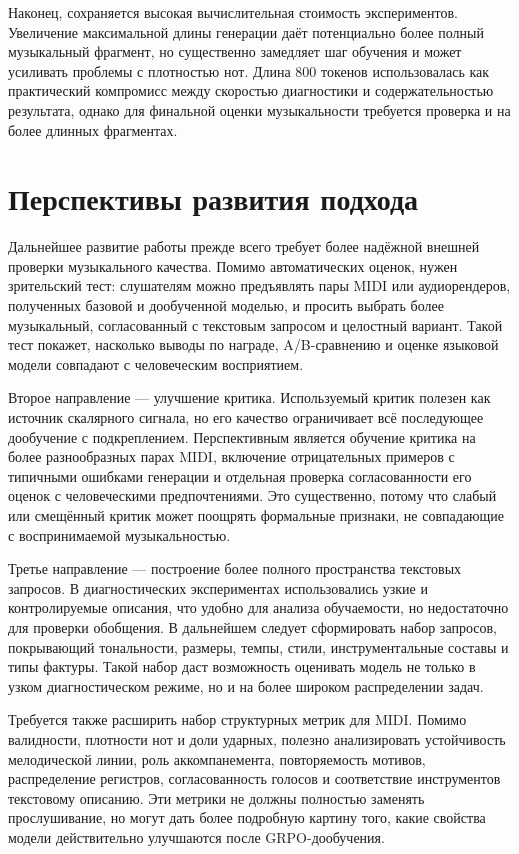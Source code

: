 \documentclass[a4paper,12pt]{extarticle}
\begin{document}
Наконец, сохраняется высокая вычислительная стоимость экспериментов.
Увеличение максимальной длины генерации даёт потенциально более полный
музыкальный фрагмент, но существенно замедляет шаг обучения и может усиливать
проблемы с плотностью нот. Длина 800 токенов использовалась как практический
компромисс между скоростью диагностики и содержательностью результата, однако
для финальной оценки музыкальности требуется проверка и на более длинных
фрагментах.

\section{Перспективы развития подхода}

Дальнейшее развитие работы прежде всего требует более надёжной внешней
проверки музыкального качества. Помимо автоматических оценок, нужен
зрительский тест: слушателям можно предъявлять пары MIDI или аудиорендеров,
полученных базовой и дообученной моделью, и просить выбрать более музыкальный,
согласованный с текстовым запросом и целостный вариант. Такой тест покажет,
насколько выводы по награде, A/B-сравнению и оценке языковой модели совпадают
с человеческим восприятием.

Второе направление --- улучшение критика. Используемый критик полезен
как источник скалярного сигнала, но его качество ограничивает всё последующее
дообучение с подкреплением. Перспективным является обучение критика на более
разнообразных
парах MIDI, включение отрицательных примеров с типичными ошибками генерации и
отдельная проверка согласованности его оценок с человеческими предпочтениями.
Это существенно, потому что слабый или смещённый критик может поощрять
формальные признаки, не совпадающие с воспринимаемой музыкальностью.

Третье направление --- построение более полного пространства текстовых запросов.
В диагностических экспериментах использовались узкие и контролируемые
описания, что удобно для анализа обучаемости, но недостаточно для проверки
обобщения. В дальнейшем следует сформировать набор запросов, покрывающий
тональности, размеры, темпы, стили, инструментальные составы и типы фактуры.
Такой набор даст возможность оценивать модель не только в узком диагностическом
режиме, но и на более широком распределении задач.

Требуется также расширить набор структурных метрик для MIDI. Помимо
валидности, плотности нот и доли ударных, полезно анализировать устойчивость
мелодической линии, роль аккомпанемента, повторяемость мотивов, распределение
регистров, согласованность голосов и соответствие инструментов текстовому
описанию. Эти метрики не должны полностью заменять прослушивание, но могут
дать более подробную картину того, какие свойства модели действительно
улучшаются после GRPO-дообучения.

\newpage 
\printbibliography[heading=bibintoc] 
\end{document}
